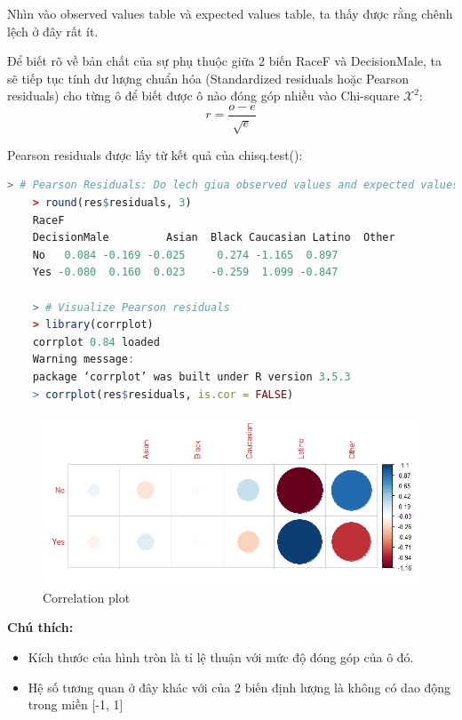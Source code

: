 \documentclass[a4paper,12pt]{article}
\begin{document}
	Nhìn vào observed values table và expected values table, ta thấy được rằng chênh lệch ở đây rất ít.
	
	Để biết rõ về bản chất của sự phụ thuộc giữa 2 biến RaceF và DecisionMale, ta sẽ tiếp tục tính dư lượng chuẩn hóa (Standardized residuals hoặc Pearson residuals) cho từng ô để biết được ô nào đóng góp nhiều vào Chi-square $\mathcal{X}^2$:
	$$r = \frac{{o - e}}{\sqrt{e}}$$
	
	Pearson residuals được lấy từ kết quả của chisq.test():
	\begin{lstlisting}[language=R]
	> # Pearson Residuals: Do lech giua observed values and expected values
	> round(res$residuals, 3)
	RaceF
	DecisionMale         Asian  Black Caucasian Latino  Other
	No   0.084 -0.169 -0.025     0.274 -1.165  0.897
	Yes -0.080  0.160  0.023    -0.259  1.099 -0.847
	
	> # Visualize Pearson residuals
	> library(corrplot)
	corrplot 0.84 loaded
	Warning message:
	package ‘corrplot’ was built under R version 3.5.3 
	> corrplot(res$residuals, is.cor = FALSE)
	\end{lstlisting}
	
	\begin{figure}[H]
		\centering
		\includegraphics[width=0.7\linewidth]{corplot}
		\caption{Correlation plot}
		\label{fig:corplot}
	\end{figure}
	
	\textbf{Chú thích:}
	\begin{itemize}
		\item Kích thước của hình tròn là tỉ lệ thuận với mức độ đóng góp của ô đó.
		\item Hệ số tương quan ở đây khác với của 2 biến định lượng là không có dao động trong miền [-1, 1]	
	\end{itemize}
	
\end{document}
